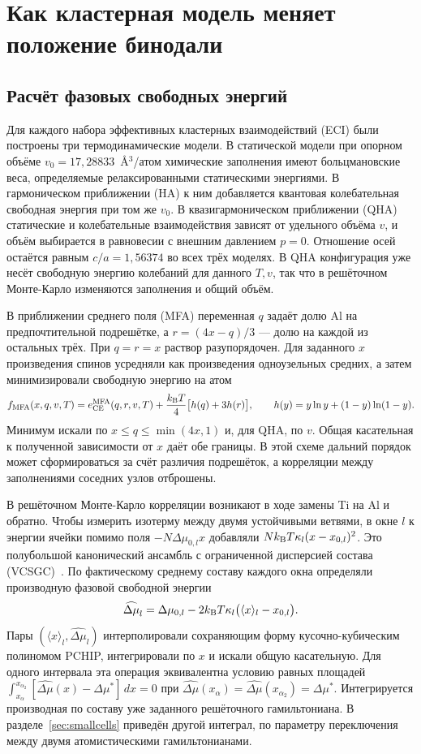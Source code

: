 \section{Как кластерная модель меняет положение бинодали}
\label{sec:ce-phases}

\subsection{Расчёт фазовых свободных энергий}
Для каждого набора эффективных кластерных взаимодействий (ECI) были
построены три термодинамические модели. В статической модели при опорном
объёме \(v_0=17{,}28833\)~\AA$^3$/атом химические заполнения имеют
больцмановские веса, определяемые релаксированными статическими энергиями.
В гармоническом приближении (HA) к ним добавляется квантовая колебательная
свободная энергия при том же \(v_0\). В квазигармоническом приближении
(QHA) статические и колебательные взаимодействия зависят от удельного
объёма \(v\), и объём выбирается в равновесии с внешним давлением \(p=0\).
Отношение осей остаётся равным \(c/a=1{,}56374\) во всех трёх моделях.
В QHA конфигурация уже несёт свободную энергию колебаний для данного
\(T,v\), так что в решёточном Монте-Карло изменяются заполнения и
общий объём.

В приближении среднего поля (MFA) переменная \(q\) задаёт долю Al
на предпочтительной подрешётке, а \(r=(4x-q)/3\) --- долю на каждой
из остальных трёх. При \(q=r=x\) раствор разупорядочен. Для заданного \(x\)
произведения спинов усредняли как произведения одноузельных средних,
а затем минимизировали свободную энергию на атом
\[
 f_{\rm MFA}(x,q,v,T)=e_{\rm CE}^{\rm MFA}(q,r,v,T)
       +\frac{k_{\rm B}T}{4}\big[h(q)+3h(r)\big],
 \qquad h(y)=y\ln y+(1-y)\ln(1-y).
\]
Минимум искали по \(x\le q\le\min(4x,1)\) и, для QHA, по \(v\).
Общая касательная к полученной зависимости от \(x\) даёт обе границы.
В этой схеме дальний порядок может сформироваться за счёт различия
подрешёток, а корреляции между заполнениями соседних узлов отброшены.

В решёточном Монте-Карло корреляции возникают в ходе замены Ti на Al
и обратно. Чтобы измерить изотерму между двумя устойчивыми ветвями,
в окне \(l\) к энергии ячейки помимо поля \(-N\Delta\mu_{0,l}x\)
добавляли \(Nk_{\rm B}T\kappa_l(x-x_{0,l})^2\). Это полубольшой
канонический ансамбль с ограниченной дисперсией состава (VCSGC)~\cite{sadigh2012}.
По фактическому среднему составу каждого окна определяли производную
фазовой свободной энергии
\[
 \widehat{\Delta\mu}_l=\Delta\mu_{0,l}
              -2k_{\rm B}T\kappa_l\big(\langle x\rangle_l-x_{0,l}\big).
\]
Пары \((\langle x\rangle_l,\widehat{\Delta\mu}_l)\)
интерполировали сохраняющим форму кусочно-кубическим полиномом PCHIP,
интегрировали по \(x\) и искали общую касательную. Для одного интервала
эта операция эквивалентна условию равных площадей
\(\int_{x_\alpha}^{x_{\alpha_2}}[\widehat{\Delta\mu}(x)-\Delta\mu^*]\,dx=0\)
при \(\widehat{\Delta\mu}(x_\alpha)=\widehat{\Delta\mu}(x_{\alpha_2})=\Delta\mu^*\).
Интегрируется производная по составу уже заданного решёточного гамильтониана.
В разделе~\ref{sec:smallcells} приведён другой интеграл, по параметру
переключения между двумя атомистическими гамильтонианами.

